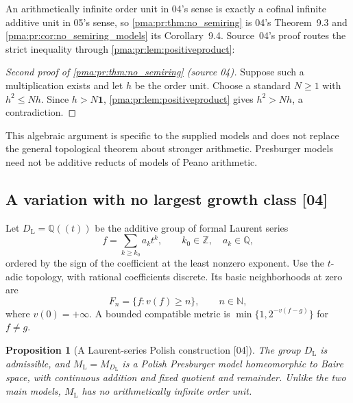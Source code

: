 \documentclass[11pt]{article}
\numberwithin{equation}{section}
\newtheorem{proposition}[proposition]{Proposition}
\theoremstyle{definition}
\theoremstyle{remark}
\newcommand{\N}{\mathbb N}
\newcommand{\Z}{\mathbb Z}
\newcommand{\Q}{\mathbb Q}
\newcommand{\one}{\mathbf 1}
\newcommand{\ML}{M_{\mathrm L}}
\newcommand{\src}[1]{\textup{\textsf{\small[#1]}}}
\begin{document}
An arithmetically infinite order unit in 04's sense is exactly a cofinal
infinite additive unit in 05's sense, so \cref{pma:pr:thm:no_semiring} is
04's Theorem~9.3 and \cref{pma:pr:cor:no_semiring_models} its Corollary~9.4.
Source~04's proof routes the strict inequality through
\cref{pma:pr:lem:positiveproduct}:

\begin{proof}[Second proof of \cref{pma:pr:thm:no_semiring} (source 04)]
Suppose such a multiplication exists and let $h$ be the order unit.
Choose a standard $N\geq1$ with $h^2\leq Nh$. Since $h>N\one$,
\cref{pma:pr:lem:positiveproduct} gives $h^2>Nh$, a contradiction.
\end{proof}

This algebraic argument is specific to the supplied models and does not
replace the general topological theorem about stronger arithmetic.
Presburger models need not be additive reducts of models of Peano
arithmetic.

\subsection{A variation with no largest growth class \src{04}}\label{pma:pr:sec:laurent}

Let $D_{\mathrm L}=\Q((t))$ be the additive group of formal Laurent series
\[
 f=\sum_{k\geq k_0}a_kt^k,\qquad k_0\in\Z,\quad a_k\in\Q,
\]
ordered by the sign of the coefficient at the least nonzero exponent.
Use the $t$-adic topology, with rational coefficients discrete. Its basic
neighborhoods at zero are
\[
 F_n=\{f:v(f)\geq n\},\qquad n\in\N,
\]
where $v(0)=+\infty$. A bounded compatible metric is
$\min\{1,2^{-v(f-g)}\}$ for $f\ne g$.

\begin{proposition}[A Laurent-series Polish construction \src{04}]\label{pma:pr:prop:laurent}
The group $D_{\mathrm L}$ is admissible, and
$\ML=M_{D_{\mathrm L}}$ is a Polish Presburger model homeomorphic to Baire
space, with continuous addition and fixed quotient and remainder. Unlike
the two main models, $\ML$ has no arithmetically infinite order unit.
\end{proposition}
\end{document}
